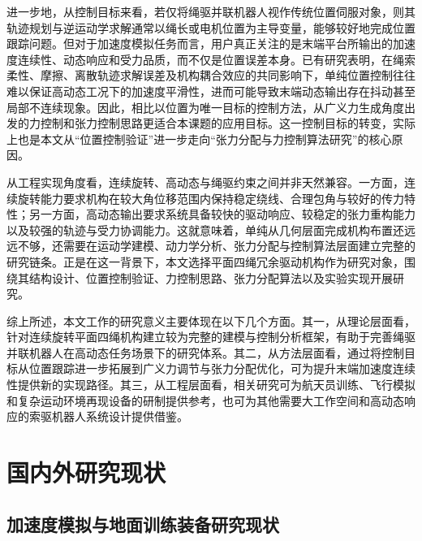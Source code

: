 进一步地，从控制目标来看，若仅将绳驱并联机器人视作传统位置伺服对象，则其轨迹规划与逆运动学求解通常以绳长或电机位置为主导变量，能够较好地完成位置跟踪问题\cite{tang2015trajectory,feiler2023mechatronic}。但对于加速度模拟任务而言，用户真正关注的是末端平台所输出的加速度连续性、动态响应和受力品质，而不仅是位置误差本身。已有研究表明，在绳索柔性、摩擦、离散轨迹求解误差及机构耦合效应的共同影响下，单纯位置控制往往难以保证高动态工况下的加速度平滑性，进而可能导致末端动态输出存在抖动甚至局部不连续现象\cite{chen2025cdprreview,wang2024dynamictension}。因此，相比以位置为唯一目标的控制方法，从广义力生成角度出发的力控制和张力控制思路更适合本课题的应用目标\cite{piao2019indirectforce,cao2023realtimetension,song2024realtimemethod}。这一控制目标的转变，实际上也是本文从“位置控制验证”进一步走向“张力分配与力控制算法研究”的核心原因。

从工程实现角度看，连续旋转、高动态与绳驱约束之间并非天然兼容。一方面，连续旋转能力要求机构在较大角位移范围内保持稳定绕线、合理包角与较好的传力特性；另一方面，高动态输出要求系统具备较快的驱动响应、较稳定的张力重构能力以及较强的轨迹与受力协调能力\cite{gonzalez2023singleloop,juarez2022dynamiccontrol,wang2024dynamictension}。这就意味着，单纯从几何层面完成机构布置还远远不够，还需要在运动学建模、动力学分析、张力分配与控制算法层面建立完整的研究链条。正是在这一背景下，本文选择平面四绳冗余驱动机构作为研究对象，围绕其结构设计、位置控制验证、力控制思路、张力分配算法以及实验实现开展研究。

综上所述，本文工作的研究意义主要体现在以下几个方面。其一，从理论层面看，针对连续旋转平面四绳机构建立较为完整的建模与控制分析框架，有助于完善绳驱并联机器人在高动态任务场景下的研究体系\cite{zhang2022stateoftheart,wang2025review}。其二，从方法层面看，通过将控制目标从位置跟踪进一步拓展到广义力调节与张力分配优化，可为提升末端加速度连续性提供新的实现路径\cite{su2016cablemass,cao2023realtimetension,wang2024dynamictension}。其三，从工程层面看，相关研究可为航天员训练、飞行模拟和复杂运动环境再现设备的研制提供参考，也可为其他需要大工作空间和高动态响应的索驱机器人系统设计提供借鉴\cite{tempel2015expo,lan2022sprayreview,zhang2009greenhouse}。

\section{国内外研究现状}

\subsection{加速度模拟与地面训练装备研究现状}

